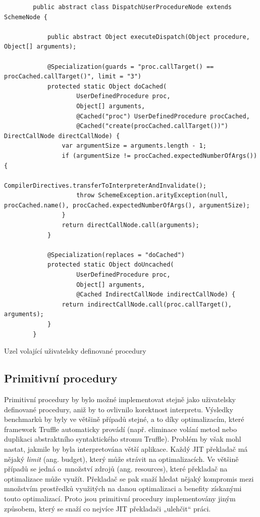 \documentclass[
  master,
  biblatex,
  figures=true,
  theorems,
  sourcecodes,
  glossaries,
  index
]{kidiplom}
\begin{document}
\begin{listing} [H]
    \begin{verbatim}
        public abstract class DispatchUserProcedureNode extends SchemeNode {
        
            public abstract Object executeDispatch(Object procedure, Object[] arguments);
        
            @Specialization(guards = "proc.callTarget() == procCached.callTarget()", limit = "3")
            protected static Object doCached(
                    UserDefinedProcedure proc,
                    Object[] arguments,
                    @Cached("proc") UserDefinedProcedure procCached,
                    @Cached("create(procCached.callTarget())") DirectCallNode directCallNode) {
                var argumentSize = arguments.length - 1;
                if (argumentSize != procCached.expectedNumberOfArgs()) {
                    CompilerDirectives.transferToInterpreterAndInvalidate();
                    throw SchemeException.arityException(null, procCached.name(), procCached.expectedNumberOfArgs(), argumentSize);
                }
                return directCallNode.call(arguments);
            }
        
            @Specialization(replaces = "doCached")
            protected static Object doUncached(
                    UserDefinedProcedure proc,
                    Object[] arguments,
                    @Cached IndirectCallNode indirectCallNode) {
                return indirectCallNode.call(proc.callTarget(), arguments);
            }
        }
    \end{verbatim}
    \caption{Uzel volající uživatelsky definované procedury}
    \label{DispatchUserProcedureNode}
\end{listing}



\subsection{Primitivní procedury}
Primitivní procedury by bylo možné implementovat stejně jako uživatelsky definované procedury, aniž by to ovlivnilo korektnost interpretu. Výsledky benchmarků by byly ve většině případů stejné, a to díky optimalizacím, které framework Truffle automaticky provádí (např. eliminace volání metod nebo duplikaci abstraktního syntaktického stromu Truffle). Problém by však mohl nastat, jakmile by byla interpretována větší aplikace. Každý JIT překladač má nějaký \textit{limit} (ang. budget), který může strávit na optimalizacích. 
Ve většině případů se jedná o~množství zdrojů (ang. resources), které překladač na optimalizace může využít. Překladač se pak snaží hledat nějaký kompromis mezi množstvím prostředků využitých na danou optimalizaci a benefity získanými touto optimalizací. Proto jsou primitivní procedury implementovány jiným způsobem, který se snaží co nejvíce JIT překladači „ulehčit“ práci.
\end{document}
